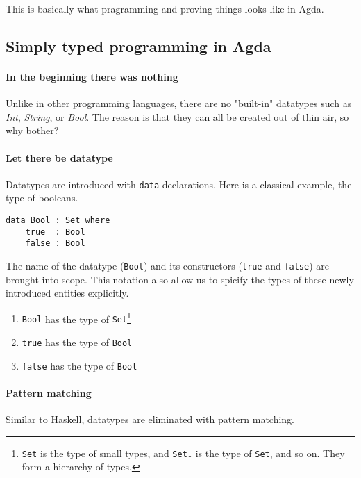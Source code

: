 \documentclass[14pt, a4paper]{article}
\begin{document}
This is basically what pragramming and proving things looks like in Agda.

\subsection{Simply typed programming in Agda}

\paragraph{In the beginning there was nothing}
Unlike in other programming languages, there are no "built-in"
datatypes such as \textit{Int}, \textit{String}, or \textit{Bool}.
The reason is that they can all be created out of thin air, so why bother?

\paragraph{Let there be datatype}
Datatypes are introduced with {\lstinline|data|} declarations. Here is a classical example, the type of booleans.

\begin{lstlisting}
data Bool : Set where
    true  : Bool
    false : Bool
\end{lstlisting}

The name of the datatype ({\lstinline|Bool|}) and its constructors ({\lstinline|true|} and {\lstinline|false|}) are brought into scope.
This notation also allow us to spicify the types of these newly introduced entities explicitly.

\begin{enumerate}
    \item {\lstinline|Bool|} has the type of {\lstinline|Set|}\footnote{{\lstinline|Set|} is the type of small types, and {\lstinline|Set₁|} is the type
of {\lstinline|Set|}, and so on. They form a hierarchy of types.}
    \item {\lstinline|true|} has the type of {\lstinline|Bool|}
    \item {\lstinline|false|} has the type of {\lstinline|Bool|}
\end{enumerate}

\paragraph{Pattern matching}
Similar to Haskell, datatypes are eliminated with pattern matching.
\end{document}
